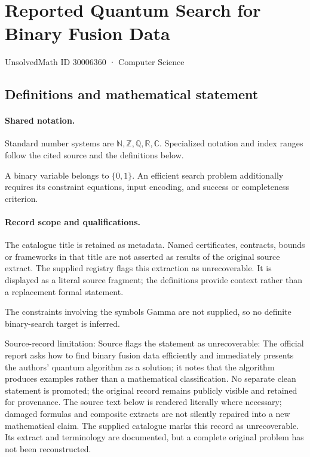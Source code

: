 \documentclass[11pt]{article}
\begin{document}
\setcounter{section}{30006359}
\section{Reported Quantum Search for Binary Fusion Data}\label{30006360}
{\small\sffamily UnsolvedMath ID 30006360 · Computer Science}
\subsection{Definitions and mathematical statement}

\paragraph{Shared notation.}Standard number systems are $\mathbb N,\mathbb Z,\mathbb Q,\mathbb R,\mathbb C$. Specialized notation and index ranges follow the cited source and the definitions below.


A binary variable belongs to $\{0,1\}$. An efficient search problem additionally requires its constraint equations, input encoding, and success or completeness criterion.
\paragraph{Record scope and qualifications.}
The catalogue title is retained as metadata. Named certificates, contracts, bounds or frameworks in that title are not asserted as results of the original source extract.
The supplied registry flags this extraction as unrecoverable. It is displayed as a literal source fragment; the definitions provide context rather than a replacement formal statement.

The constraints involving the symbols Gamma are not supplied, so no definite binary-search target is inferred.

Source-record limitation: Source flags the statement as unrecoverable: The official report asks how to find binary fusion data efficiently and immediately presents the authors’ quantum algorithm as a solution; it notes that the algorithm produces examples rather than a mathematical classification. No separate clean statement is promoted; the original record remains publicly visible and retained for provenance.
The source text below is rendered literally where necessary; damaged formulas and composite extracts are not silently repaired into a new mathematical claim.
The supplied catalogue marks this record as unrecoverable. Its extract and terminology are documented, but a complete original problem has not been reconstructed.
\end{document}
